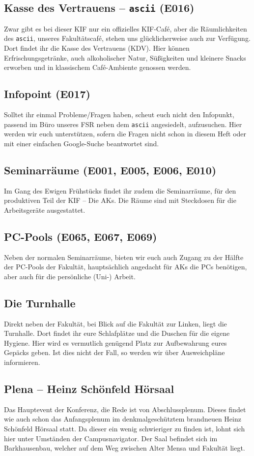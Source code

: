 \subsection*{Kasse des Vertrauens – \texttt{ascii} (E016)}
Zwar gibt es bei dieser KIF nur ein offizielles KIF-Café, aber die Räumlichkeiten des \texttt{ascii}, unseres Fakultätscafé, stehen uns glücklicherweise auch zur Verfügung.
Dort findet ihr die Kasse des Vertrauens (KDV).
Hier können Erfrischungsgetränke, auch alkoholischer Natur, Süßigkeiten und kleinere Snacks erworben und in klassischem Café-Ambiente genossen werden.

\subsection*{Infopoint (E017)}
Solltet ihr einmal Probleme/Fragen haben, scheut euch nicht den Infopunkt, passend im Büro unseres FSR neben dem \texttt{ascii} angesiedelt, aufzusuchen.
Hier werden wir euch unterstützen, sofern die Fragen nicht schon in diesem Heft oder mit einer einfachen Google-Suche beantwortet sind.

\subsection*{Seminarräume (E001, E005, E006, E010)}
Im Gang des Ewigen Frühstücks findet ihr zudem die Seminarräume, für den produktiven Teil der KIF -- Die AKs.
Die Räume sind mit Steckdosen für die Arbeitsgeräte ausgestattet.

\subsection*{PC-Pools (E065, E067, E069)}
Neben der normalen Seminarräume, bieten wir euch auch Zugang zu der Hälfte der PC-Pools der Fakultät, hauptsächlich angedacht für AKs die PCs benötigen, aber auch für die persönliche (Uni-) Arbeit.

\subsection*{Die Turnhalle}
Direkt neben der Fakultät, bei Blick auf die Fakultät zur Linken, liegt die Turnhalle.
Dort findet ihr eure Schlafplätze und die Duschen für die eigene Hygiene.
Hier wird es vermutlich genügend Platz zur Aufbewahrung eures Gepäcks geben.
Ist dies nicht der Fall, so werden wir über Ausweichpläne informieren.

\subsection*{Plena -- Heinz Schönfeld Hörsaal}
Das Hauptevent der Konferenz, die Rede ist von Abschlussplenum.
Dieses findet wie auch schon das Anfangsplenum im denkmalgeschütztem brandneuen Heinz Schönfeld Hörsaal statt.
Da dieser ein wenig schwieriger zu finden ist, lohnt sich hier unter Umständen der Campusnavigator.
Der Saal befindet sich im Barkhausenbau, welcher auf dem Weg zwischen Alter Mensa und Fakultät liegt.

